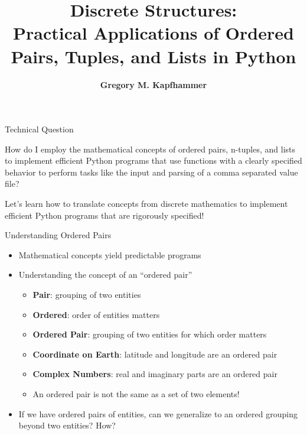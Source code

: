 \documentclass[14pt,aspectratio=169]{beamer}
\title{Discrete Structures: \\ Practical Applications of Ordered Pairs, Tuples,
and Lists in Python}
\author{{\bf Gregory M. Kapfhammer}}
\institute[shortinst]{{\bf Department of Computer Science, Allegheny College}}
\begin{document}
{
  \begin{frame}
    \titlepage
  \end{frame}
}

%
\begin{frame}{Technical Question}
  \hspace*{.25in}
  \begin{minipage}{4.8in}
    \vspace*{.1in}
    \begin{center}
      {\large How do I employ the mathematical concepts of ordered pairs,
        n-tuples, and lists to implement efficient Python programs that use
        functions with a clearly specified behavior to perform tasks like the input
      and parsing of a comma separated value file?}
    \end{center}
  \end{minipage}
  \vspace{2ex}
  \begin{center}
    \small Let's learn how to translate concepts from discrete mathematics to
    implement efficient Python programs that are rigorously specified!
  \end{center}
\end{frame}

%
\begin{frame}{Understanding Ordered Pairs}
  \begin{itemize}
    \item Mathematical concepts yield predictable programs
      \vspace*{-.15in}
    \item Understanding the concept of an ``ordered pair''
      \begin{itemize}
        \item {\bf Pair}: grouping of two entities
        \item {\bf Ordered}: order of entities matters
        \item {\bf Ordered Pair}: grouping of two entities for which order
          matters
        \item {\bf Coordinate on Earth}: latitude and longitude are an ordered
          pair
        \item {\bf Complex Numbers}: real and imaginary parts are an ordered
          pair
        \item An ordered pair is not the same as a set of two elements!
      \end{itemize}
      \vspace*{-.2in}
    \item If we have ordered pairs of entities, can we generalize to
      an ordered grouping beyond two entities? How?
  \end{itemize}
\end{frame}
\end{document}
